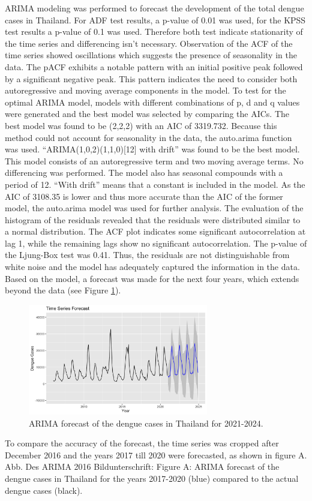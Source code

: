 	ARIMA modeling was performed to forecast the development of the total dengue cases in Thailand. For ADF test results, a p-value of 0.01 was used, for the KPSS test results a p-value of 0.1 was used. Therefore both test indicate stationarity of the time series and differencing isn’t necessary. Observation of the ACF of the time series showed oscillations which suggests the presence of seasonality in the data. The pACF exhibits a notable pattern with an initial positive peak followed by a significant negative peak. This pattern indicates the need to consider both autoregressive and moving average components in the model.
	To test for the optimal ARIMA model, models with different combinations of p, d and q values were generated and the best model was selected by comparing the AICs. The best model was found to be (2,2,2) with an AIC of 3319.732. Because this method could not account for seasonality in the data, the auto.arima function was used. “ARIMA(1,0,2)(1,1,0)[12] with drift” was found to be the best model. This model consists of an autoregressive term and two moving average terms. No differencing was performed. The model also has seasonal compounds with a period of 12. “With drift” means that a constant is included in the model. As the AIC of 3108.35 is lower and thus more accurate than the AIC of the former model, the auto.arima model was used for further analysis. 
	The evaluation of the histogram of the residuals revealed that the residuals were distributed similar to a normal distribution. The ACF plot indicates some significant autocorrelation at lag 1, while the remaining lags show no significant autocorrelation. The p-value of the Ljung-Box test was 0.41. Thus, the residuals are not distinguishable from white noise and the model has adequately captured the information in the data. 
	Based on the model, a forecast was made for the next four years, which extends beyond the data (see Figure \ref{fig:Auto_ARIMA_forecast}). 
	
		\begin{figure}[hbpt] 
		\centering
		\includegraphics[width=0.7\textwidth]{fig/Auto_ARIMA_forecast.png}
		\caption{ARIMA forecast of the dengue cases in Thailand for 2021-2024.}
		\label{fig:Auto_ARIMA_forecast}
	\end{figure}
 
	To compare the accuracy of the forecast, the time series was cropped after December 2016 and the years 2017 till 2020 were forecasted, as shown in figure A. 
	Abb. Des ARIMA 2016
	Bildunterschrift: Figure A: ARIMA forecast of the dengue cases in Thailand for the years 2017-2020 (blue) compared to the actual dengue cases (black).
	
	